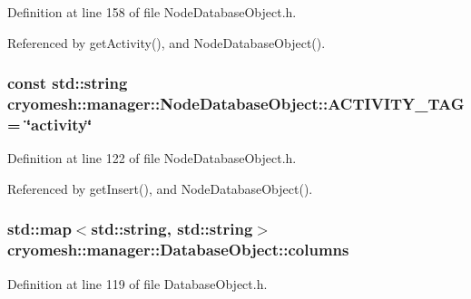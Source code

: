 \-Definition at line 158 of file \-Node\-Database\-Object.\-h.



\-Referenced by get\-Activity(), and \-Node\-Database\-Object().

\hypertarget{classcryomesh_1_1manager_1_1NodeDatabaseObject_a5b88df8ce26dc6ee6b7f2fd369ee88d7}{
\subsubsection[{\-A\-C\-T\-I\-V\-I\-T\-Y\-\_\-\-T\-A\-G}]{\setlength{\rightskip}{0pt plus 5cm}const std\-::string {\bf cryomesh\-::manager\-::\-Node\-Database\-Object\-::\-A\-C\-T\-I\-V\-I\-T\-Y\-\_\-\-T\-A\-G} = \char`\"{}activity\char`\"{}}}\label{classcryomesh_1_1manager_1_1NodeDatabaseObject_a5b88df8ce26dc6ee6b7f2fd369ee88d7}


\-Definition at line 122 of file \-Node\-Database\-Object.\-h.



\-Referenced by get\-Insert(), and \-Node\-Database\-Object().

\hypertarget{classcryomesh_1_1manager_1_1DatabaseObject_a9c648bf09b9fd8b4d599b0d4f4abf531}{
\subsubsection[{columns}]{\setlength{\rightskip}{0pt plus 5cm}std\-::map$<$std\-::string, std\-::string$>$ {\bf cryomesh\-::manager\-::\-Database\-Object\-::columns}}}\label{classcryomesh_1_1manager_1_1DatabaseObject_a9c648bf09b9fd8b4d599b0d4f4abf531}


\-Definition at line 119 of file \-Database\-Object.\-h.



